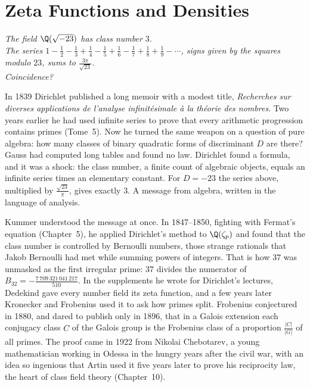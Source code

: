 \chapter{Zeta Functions and Densities}
\begin{center}\itshape
The field $\Q(\sqrt{-23})$ has class number $3$.\\
The series $1-\frac12-\frac13+\frac14-\frac15+\frac16-\frac17+\frac18+\frac19-\cdots$, signs given by the squares modulo $23$, sums to $\frac{3\pi}{\sqrt{23}}$.\\
Coincidence?
\end{center}

In 1839 Dirichlet published a long memoir with a modest title, \emph{Recherches sur diverses applications de l'analyse
infinit\'esimale \`a la th\'eorie des nombres}. Two years earlier he had used infinite series to prove that every arithmetic
progression contains primes (Tome~5). Now he turned the same weapon on a question of pure algebra: how many classes of
binary quadratic forms of discriminant $D$ are there? Gauss had computed long tables and found no law. Dirichlet found a
formula, and it was a shock: the class number, a finite count of algebraic objects, equals an infinite series times an
elementary constant. For $D=-23$ the series above, multiplied by $\frac{\sqrt{23}}\pi$, gives exactly $3$. A message from
algebra, written in the language of analysis.

Kummer understood the message at once. In 1847--1850, fighting with Fermat's equation (Chapter~5), he applied Dirichlet's
method to $\Q(\zeta_p)$ and found that the class number is controlled by Bernoulli numbers, those strange rationals that
Jakob Bernoulli had met while summing powers of integers. That is how $37$ was unmasked as the first irregular prime: $37$
divides the numerator of $B_{32}=-\frac{7\,709\,321\,041\,217}{510}$. In the supplements he wrote for Dirichlet's lectures, Dedekind gave every number field its zeta
function, and a few years later Kronecker and Frobenius used it to ask how primes split. Frobenius conjectured in 1880, and
dared to publish only in 1896, that in a Galois extension each conjugacy class $C$ of the Galois group is the Frobenius class
of a proportion $\frac{|C|}{|G|}$ of all primes. The proof came in 1922 from Nikolai Chebotarev, a young mathematician
working in Odessa in the hungry years after the civil war, with an idea so ingenious that Artin used it five years later to
prove his reciprocity law, the heart of class field theory (Chapter~10).


